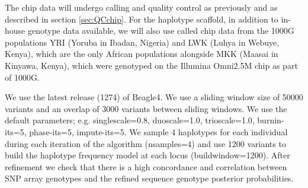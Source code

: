 The chip data will undergo calling and quality control as previously\cite{Gurdasani2015} and as described in section \ref{sec:QCchip}. For the haplotype scaffold, in addition to in-house genotype data available, we will also use called chip data from the 1000G populations YRI (Yoruba in Ibadan, Nigeria) and LWK (Luhya in Webuye, Kenya), which are the only African populations alongside MKK (Maasai in Kinyawa, Kenya), which were genotyped on the Illumina Omni2.5M chip as part of 1000G.

We use the latest release (1274) of Beagle4. We use a sliding window size of 50000 variants and an overlap of 3000 variants between sliding windows. We use the default parameters; e.g. singlescale=0.8, duoscale=1.0, trioscale=1.0, burnin-its=5, phase-its=5, impute-its=5. We sample 4 haplotypes for each individual during each iteration of the algorithm (nsamples=4) and use 1200 variants to build the haplotype frequency model at each locus (buildwindow=1200). After refinement we check that there is a high concordance and correlation between SNP array genotypes and the refined sequence genotype posterior probabilities.


